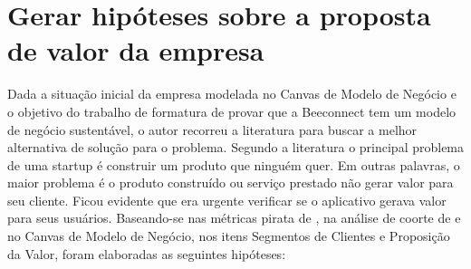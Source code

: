\section{Gerar hipóteses sobre a proposta de valor da empresa}
\label{cha:gerar_hipoteses}
Dada a situação inicial da empresa modelada no Canvas de Modelo de Negócio e o objetivo do trabalho de formatura de provar que a Beeconnect tem um modelo de negócio sustentável, o autor recorreu a literatura para buscar a melhor alternativa de solução para o problema. 
Segundo a literatura o principal problema de uma startup é construir um produto que ninguém quer. Em outras palavras, o maior problema é o produto construído ou serviço prestado não gerar valor para seu cliente.
Ficou evidente que era urgente verificar se o aplicativo gerava valor para seus usuários. Baseando-se nas métricas pirata de , na análise de coorte de  e no Canvas de Modelo de Negócio, nos itens Segmentos de Clientes e Proposição da Valor, foram elaboradas as seguintes hipóteses:
